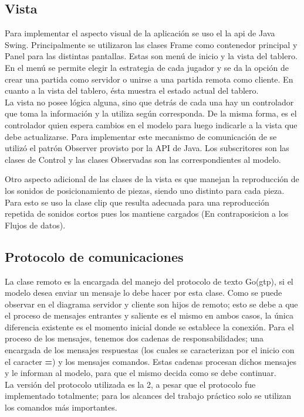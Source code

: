 \documentclass[11pt]{article}
\begin{document}
\subsection{Vista}
\label{sec-4.1}


Para implementar el aspecto visual de la aplicaci\'on se uso el la api de Java Swing. Principalmente se utilizaron las clases Frame como contenedor principal y Panel para las distintas pantallas. 
Estas son men\'u de inicio y  la vista del tablero.
En el men\'u se permite elegir la estrategia de cada jugador y se da la opci\'on de crear una partida como servidor o unirse a una partida remota como cliente.
En cuanto a la vista del tablero, \'esta muestra el estado actual del tablero. \\
La vista no posee l\'ogica alguna, sino que detr\'as de cada una hay un controlador que toma la informaci\'on y la utiliza seg\'un corresponda. 
De la misma forma, es el controlador quien espera cambios en el modelo para luego indicarle a la vista que debe actualizarse. Para implementar este mecanismo de comunicaci\'on de se utiliz\'o el patr\'on Observer provisto por la API de Java. Los subscritores son las clases de Control y las clases Observadas son las correspondientes al modelo.

Otro aspecto adicional de las clases de la vista es que manejan la reproducción de los sonidos de posicionamiento de piezas, siendo uno distinto para cada pieza. Para esto se uso la clase clip que resulta adecuada para una reproducci\'on repetida de sonidos cortos pues los mantiene cargados (En contraposicion a los Flujos de datos).

\subsection{Protocolo de comunicaciones}
\label{sec-4.2}
%  

La clase remoto es la encargada del manejo del protocolo de texto Go(gtp), 
si el modelo desea enviar un mensaje lo debe hacer por esta clase. 
Como se puede observar en el diagrama servidor y cliente son hijos de remoto; 
esto se debe a que el proceso de mensajes entrantes y saliente es el mismo en ambos casos, 
la \'unica diferencia existente es el momento inicial donde se establece la conexi\'on. 
Para el proceso de los mensajes, tenemos dos cadenas de responsabilidades; una encargada de los mensajes respuestas
(los cuales se caracterizan por el inicio con el caracter \textbf{=}) y los mensajes comandos. 
Estas cadenas procesan dichos mensajes y le informan al modelo, para que el mismo decida como se debe continuar. \\
La versi\'on del protocolo utilizada es la 2, a pesar que el protocolo fue implementado totalmente; 
para los alcances del trabajo pr\'actico solo se utilizan los comandos m\'as importantes.
\end{document}
